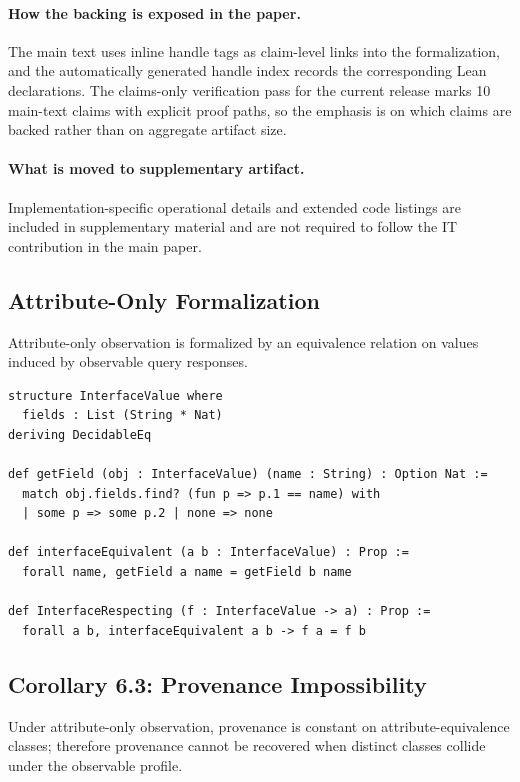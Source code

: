 \paragraph{How the backing is exposed in the paper.}
The main text uses inline handle tags as claim-level links into the formalization, and the automatically generated handle index records the corresponding Lean declarations. The claims-only verification pass for the current release marks 10 main-text claims with explicit proof paths, so the emphasis is on which claims are backed rather than on aggregate artifact size. 

\paragraph{What is moved to supplementary artifact.}
Implementation-specific operational details and extended code listings are included in supplementary material and are not required to follow the IT contribution in the main paper.

\subsection{Attribute-Only Formalization}\label{interface-only-formalization}

Attribute-only observation is formalized by an equivalence relation on values induced by observable query responses.

\begin{lstlisting}[style=lean]
structure InterfaceValue where
  fields : List (String * Nat)
deriving DecidableEq

def getField (obj : InterfaceValue) (name : String) : Option Nat :=
  match obj.fields.find? (fun p => p.1 == name) with
  | some p => some p.2 | none => none

def interfaceEquivalent (a b : InterfaceValue) : Prop :=
  forall name, getField a name = getField b name

def InterfaceRespecting (f : InterfaceValue -> a) : Prop :=
  forall a b, interfaceEquivalent a b -> f a = f b
\end{lstlisting}

\subsection{Corollary 6.3: Provenance Impossibility}\label{corollary-6.3-interface-only-cannot-provide-provenance}

Under attribute-only observation, provenance is constant on attribute-equivalence classes; therefore provenance cannot be recovered when distinct classes collide under the observable profile.

